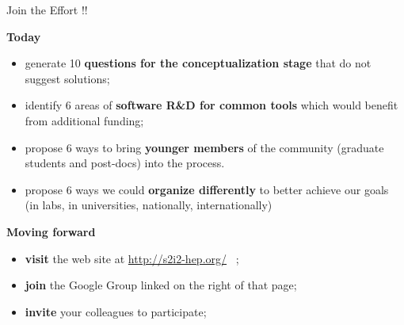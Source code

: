\documentclass[compress,10]{beamer}
\begin{document}
\begin{frame}{Join the Effort !!}
{}
{\footnotesize
\textcolor{LHCb dark}{\bf Today}
\begin{itemize}
  \item
    generate 10 \textcolor{brickred}{\bf questions for the conceptualization 
    stage} that 
    do not suggest solutions;
  \item
    identify 6 areas of \textcolor{brickred}{\bf software R\&D for common 
    tools}
    which would benefit from
    additional funding;
  \item
    propose 6 ways to bring \textcolor{brickred}{\bf younger members}
     of the community
    (graduate students and post-docs) into the process.
  \item propose 6 ways we could \textcolor{brickred}{\bf organize differently} to better achieve our goals (in labs, in universities, nationally, internationally)
\end{itemize}
\vskip 0.1in
\textcolor{LHCb dark}{\bf Moving forward}
\begin{itemize}
 \item
  \textcolor{brickred}{\bf visit}
    the web site at  \url{http://s2i2-hep.org/}  \, ;
 \item
  \textcolor{brickred}{\bf join}
   the Google Group linked on the right of that page;
 \item
  \textcolor{brickred}{\bf invite} your colleagues to participate;
\end{itemize}
}  %

\end{frame}





\end{document}
